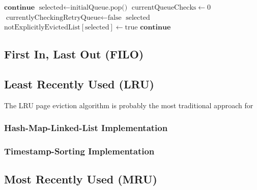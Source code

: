 \begin{@empty}
\begin{algorithm}[ht!]
\begin{algorithmic}[1]
                                \State $\textbf{continue}$
                            \EndIf
                        \Else
                            \State $\text{selected} \gets \text{initialQueue.pop()}$
                                \State $\text{currentQueueChecks} \gets 0$
                                \State $\text{currentlyCheckingRetryQueue} \gets \text{false}$
                                \Return $\text{selected}$
                            \Else
                                \State $\text{notExplicitlyEvictedList}\left[\text{selected}\right] \gets \text{true}$
                                \State $\textbf{continue}$
                            \EndIf            
                        \EndIf
                    \EndIf
                \EndWhile
            \EndFunction
        \end{algorithmic}
    \end{algorithm}
\end{@empty}

\subsection[FILO]{First In, Last Out (FILO)} \label{subsec:filo}

    

\subsection[LRU]{Least Recently Used (LRU)} \label{subsec:lru}

    The LRU page eviction algorithm is probably the most traditional approach for 

\subsubsection[Hash-Map-Linked-List]{Hash-Map-Linked-List Implementation} \label{subsubsec:lru_traditional}

    

\subsubsection[Timestamp-Sorting]{Timestamp-Sorting Implementation} \label{subsubsec:lru_timestamp}

    

\subsection[MRU]{Most Recently Used (MRU)} \label{subsec:mru}

